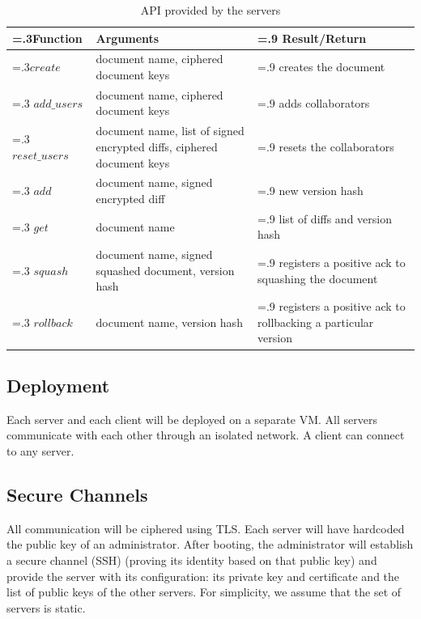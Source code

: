 \begin{table}[ht]
    \centering
    \caption{API provided by the servers}
    \begin{tabularx}{\textwidth}{>{\hsize=.3\hsize}X | X | >{\hsize=.9\hsize}X }
        \hline
        \textbf{Function} & \textbf{Arguments} & \textbf{Result/Return} \\
        \hline
        $create$ & document name, ciphered document keys & creates the document \\
        \hline
        $add\_users$ & document name, ciphered document keys & adds collaborators  \\
        \hline
        $reset\_users$ & document name, list of signed encrypted diffs, ciphered document keys & resets the collaborators  \\
        \hline
        $add$ & document name, signed encrypted diff & new version hash \\
        \hline
        $get$ & document name & list of diffs and version hash \\
        \hline
        $squash$ & document name, signed squashed document, version hash & registers a positive ack to squashing the document\\
        \hline
        $rollback$ & document name, version hash & registers a positive ack to rollbacking a particular version\\
        \hline
    \end{tabularx}
    \label{tab:api}
\end{table}

\subsection{Deployment}

Each server and each client will be deployed on a separate VM.
All servers communicate with each other through an isolated network.
A client can connect to any server.

\subsection{Secure Channels}

All communication will be ciphered using TLS. Each server will
have hardcoded the public key of an administrator. After booting,
the administrator will establish a secure channel (SSH) (proving its
identity based on that public key) and provide the server with
its configuration: its private key and certificate and the list
of public keys of the other servers. For simplicity, we assume
that the set of servers is static.

